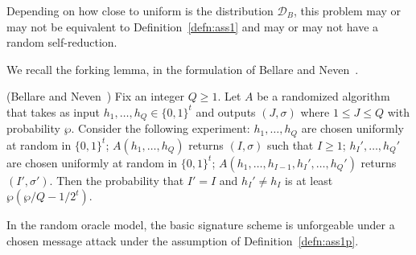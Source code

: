 \documentclass{llncs}
\newcommand{\D}{\mathcal{D}}
\begin{document}
Depending on how close to uniform is the distribution $\D_B$, this problem may or may not be equivalent to Definition~\ref{defn:ass1} and may or may not have a random self-reduction.


We recall the forking lemma, in the formulation of Bellare and Neven~\cite{BN06}.

\begin{lemma} \label{forking-lemma} (Bellare and Neven~\cite{BN06})
Fix an integer $Q \ge 1$. Let $A$ be a randomized algorithm that takes as input $h_1, \dots, h_Q \in \{0,1\}^t$ and outputs $(J, \sigma)$ where $ 1\le J \le Q$ with probability $\wp$.
Consider the following experiment: $h_1, \dots, h_Q$ are chosen uniformly at random in $\{0,1\}^t$; $A(h_1, \dots, h_Q )$ returns $(I,\sigma)$ such that $I \ge 1$; $h_I', \dots, h_Q'$ are chosen uniformly at random in $\{0,1\}^t$; $A( h_1, \dots, h_{I-1}, h_I', \dots, h_Q' )$ returns $(I', \sigma')$.
Then the probability that $I' = I$ and $h_{I}' \ne h_I$ is at least $\wp( \wp/Q - 1/2^t )$.
\end{lemma}


\begin{theorem}\label{thm:security-basic}
In the random oracle model, the basic signature scheme is unforgeable under a chosen message attack under the assumption of Definition~\ref{defn:ass1p}.
\end{theorem}
\end{document}
